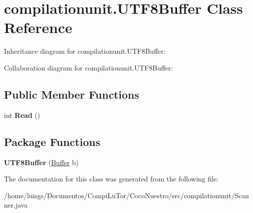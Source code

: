 \hypertarget{classcompilationunit_1_1_u_t_f8_buffer}{
\section{compilationunit.UTF8Buffer Class Reference}
\label{classcompilationunit_1_1_u_t_f8_buffer}
}


Inheritance diagram for compilationunit.UTF8Buffer:


Collaboration diagram for compilationunit.UTF8Buffer:
\subsection*{Public Member Functions}
\begin{DoxyCompactItemize}
\item 
\hypertarget{classcompilationunit_1_1_u_t_f8_buffer_a6c5dbd5fb9ecbe7fbe4c57aeb532996f}{
int {\bfseries Read} ()}
\label{classcompilationunit_1_1_u_t_f8_buffer_a6c5dbd5fb9ecbe7fbe4c57aeb532996f}

\end{DoxyCompactItemize}
\subsection*{Package Functions}
\begin{DoxyCompactItemize}
\item 
\hypertarget{classcompilationunit_1_1_u_t_f8_buffer_a4c4fed04418722677bebfb33d0a0f85b}{
{\bfseries UTF8Buffer} (\hyperlink{classcompilationunit_1_1_buffer}{Buffer} b)}
\label{classcompilationunit_1_1_u_t_f8_buffer_a4c4fed04418722677bebfb33d0a0f85b}

\end{DoxyCompactItemize}


The documentation for this class was generated from the following file:\begin{DoxyCompactItemize}
\item 
/home/luisgs/Documentos/CompiLuTor/CocoNuestro/src/compilationunit/Scanner.java\end{DoxyCompactItemize}
